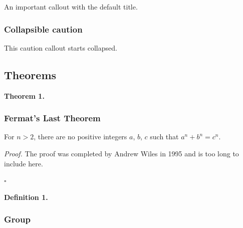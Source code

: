\documentclass[11pt]{article}
\begin{document}
\begin{tcolorbox}[enhanced, breakable, colback=violet!5, colframe=violet!40,
  left=4pt, right=4pt, top=4pt, bottom=4pt,
  boxrule=0pt, leftrule=3pt, arc=0pt, outer arc=0pt,
  title=Important, fonttitle=\bfseries]
An important callout with the default title.



\end{tcolorbox}


\begin{tcolorbox}[enhanced, breakable, colback=red!5, colframe=red!40,
  left=4pt, right=4pt, top=4pt, bottom=4pt,
  boxrule=0pt, leftrule=3pt, arc=0pt, outer arc=0pt,
  title=Caution, fonttitle=\bfseries]
\subsubsection{Collapsible caution}
\label{collapsible-caution}

This caution callout starts collapsed.



\end{tcolorbox}

\subsection{Theorems}
\label{sec-theorems}



\par\medskip\noindent\textbf{Theorem 1.}\label{thm-fermat} \itshape{} \subsubsection{Fermat's Last Theorem}
\label{fermats-last-theorem}

For $n > 2$, there are no positive integers $a$, $b$, $c$ such that $a^n + b^n = c^n$.

\upshape\medskip

\par\medskip\noindent\textit{ Proof.} The proof was completed by Andrew Wiles in 1995 and is too long to include here.

 \hfill$\square$\medskip

\par\medskip\noindent\textbf{Definition 1.}\label{def-group} \subsubsection{Group}
\label{group}
\end{document}
